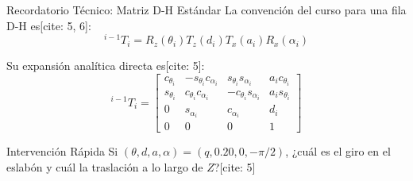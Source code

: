 \documentclass[aspectratio=169, table, xcdraw]{beamer}
\begin{document}
\begin{frame}{Recordatorio Técnico: Matriz D-H Estándar}
    La convención del curso para una fila D-H es[cite: 5, 6]:
    \begin{equation*}
        {}^{i-1}T_i = R_z(\theta_i) T_z(d_i) T_x(a_i) R_x(\alpha_i)
    \end{equation*}

    Su expansión analítica directa es[cite: 5]:
    \begin{equation*}
        \boxed{
        {}^{i-1}T_i =
        \begin{bmatrix}
        c_{\theta_i} & -s_{\theta_i}c_{\alpha_i} & s_{\theta_i}s_{\alpha_i} & a_i c_{\theta_i} \\
        s_{\theta_i} & c_{\theta_i}c_{\alpha_i} & -c_{\theta_i}s_{\alpha_i} & a_i s_{\theta_i} \\
        0 & s_{\alpha_i} & c_{\alpha_i} & d_i \\
        0 & 0 & 0 & 1
        \end{bmatrix}
        }
    \end{equation*}
    
    \begin{alertblock}{Intervención Rápida}
        Si $(\theta, d, a, \alpha) = (q, 0.20, 0, -\pi/2)$, ¿cuál es el giro en el eslabón y cuál la traslación a lo largo de $Z$?[cite: 5]
    \end{alertblock}
\end{frame}
\end{document}
